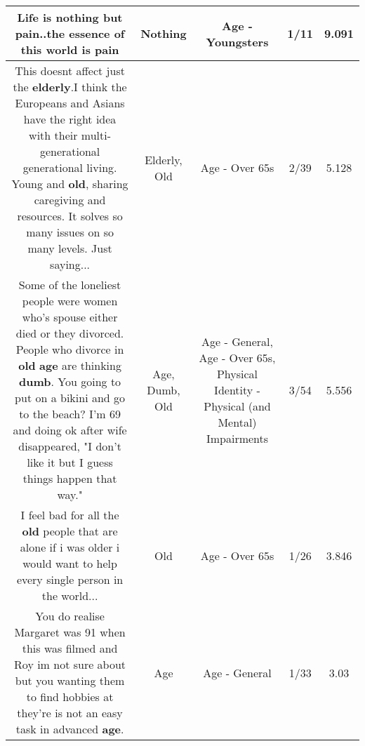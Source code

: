 \documentclass[11pt]{article}
\newlength\mylength
\begin{document}
\begin{center}
\begin{longtable}{|C{.65\mylength}|C{.30\mylength}|C{.12\mylength}|C{.12\mylength}|C{.12\mylength}|}
  \small Life is \textbf{nothing} but pain..the essence of this world is pain\normalsize   & Nothing & Age - Youngsters & 1/11 & 9.091 \\  \hline
  \small This doesnt affect just the \textbf{elderly}.I think the Europeans and Asians have the right idea with their multi-generational generational living.  Young and \textbf{old}, sharing caregiving and resources.  It solves so many issues on so many levels.  Just saying...\normalsize   & Elderly, Old & Age - Over 65s & 2/39 & 5.128 \\  \hline
  \small Some of the loneliest people were women who's spouse either died or they divorced.  People who divorce in \textbf{old} \textbf{age} are thinking \textbf{dumb}.  You going to put on a bikini and go to the beach?  I'm 69 and doing ok after wife disappeared, "I don't like it but I guess things happen that way."\normalsize   & Age, Dumb, Old & Age - General, Age - Over 65s, Physical Identity - Physical (and Mental) Impairments & 3/54 & 5.556 \\  \hline
  \small I feel bad for all the \textbf{old} people that are alone if i was older i would want to help every single person in the world...\normalsize   & Old & Age - Over 65s & 1/26 & 3.846 \\  \hline
  \small You do realise Margaret was 91 when this was filmed and Roy im not sure about but you wanting them to find hobbies at they're is not an easy task in advanced \textbf{age}.\normalsize   & Age & Age - General & 1/33 & 3.03 \\  \hline

\end{longtable}
\end{center}
\end{document}
